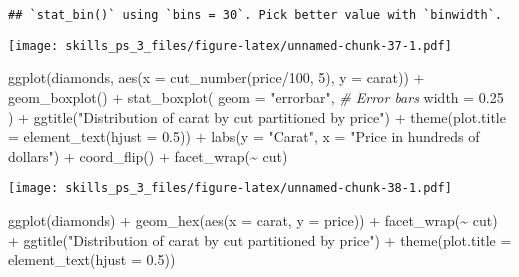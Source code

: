 \documentclass[
]{article}
\newenvironment{Shaded}{\begin{snugshade}}{\end{snugshade}}
\newcommand{\AttributeTok}[1]{\textcolor[rgb]{0.77,0.63,0.00}{#1}}
\newcommand{\CommentTok}[1]{\textcolor[rgb]{0.56,0.35,0.01}{\textit{#1}}}
\newcommand{\DecValTok}[1]{\textcolor[rgb]{0.00,0.00,0.81}{#1}}
\newcommand{\FloatTok}[1]{\textcolor[rgb]{0.00,0.00,0.81}{#1}}
\newcommand{\FunctionTok}[1]{\textcolor[rgb]{0.00,0.00,0.00}{#1}}
\newcommand{\NormalTok}[1]{#1}
\newcommand{\SpecialCharTok}[1]{\textcolor[rgb]{0.00,0.00,0.00}{#1}}
\newcommand{\StringTok}[1]{\textcolor[rgb]{0.31,0.60,0.02}{#1}}
\begin{document}
\begin{verbatim}
## `stat_bin()` using `bins = 30`. Pick better value with `binwidth`.
\end{verbatim}

\texttt{[image: skills\_ps\_3\_files/figure-latex/unnamed-chunk-37-1.pdf]}

\begin{Shaded}
\begin{Highlighting}[]
\FunctionTok{ggplot}\NormalTok{(diamonds, }\FunctionTok{aes}\NormalTok{(}\AttributeTok{x =} \FunctionTok{cut\_number}\NormalTok{(price}\SpecialCharTok{/}\DecValTok{100}\NormalTok{, }\DecValTok{5}\NormalTok{), }\AttributeTok{y =}\NormalTok{ carat)) }\SpecialCharTok{+} 
  \FunctionTok{geom\_boxplot}\NormalTok{() }\SpecialCharTok{+}
  \FunctionTok{stat\_boxplot}\NormalTok{(}
    \AttributeTok{geom =} \StringTok{"errorbar"}\NormalTok{, }\CommentTok{\# Error bars}
    \AttributeTok{width =} \FloatTok{0.25}
\NormalTok{  )  }\SpecialCharTok{+}
  \FunctionTok{ggtitle}\NormalTok{(}\StringTok{"Distribution of carat by cut partitioned by price"}\NormalTok{) }\SpecialCharTok{+}
  \FunctionTok{theme}\NormalTok{(}\AttributeTok{plot.title =} \FunctionTok{element\_text}\NormalTok{(}\AttributeTok{hjust =} \FloatTok{0.5}\NormalTok{)) }\SpecialCharTok{+}
  \FunctionTok{labs}\NormalTok{(}\AttributeTok{y =} \StringTok{"Carat"}\NormalTok{, }\AttributeTok{x =} \StringTok{"Price in hundreds of dollars"}\NormalTok{) }\SpecialCharTok{+}
  \FunctionTok{coord\_flip}\NormalTok{() }\SpecialCharTok{+}
  \FunctionTok{facet\_wrap}\NormalTok{(}\SpecialCharTok{\textasciitilde{}}\NormalTok{ cut)}
\end{Highlighting}
\end{Shaded}

\texttt{[image: skills\_ps\_3\_files/figure-latex/unnamed-chunk-38-1.pdf]}

\begin{Shaded}
\begin{Highlighting}[]
\FunctionTok{ggplot}\NormalTok{(diamonds) }\SpecialCharTok{+} 
  \FunctionTok{geom\_hex}\NormalTok{(}\FunctionTok{aes}\NormalTok{(}\AttributeTok{x =}\NormalTok{ carat, }\AttributeTok{y =}\NormalTok{ price)) }\SpecialCharTok{+}
  \FunctionTok{facet\_wrap}\NormalTok{(}\SpecialCharTok{\textasciitilde{}}\NormalTok{ cut) }\SpecialCharTok{+}
  \FunctionTok{ggtitle}\NormalTok{(}\StringTok{"Distribution of carat by cut partitioned by price"}\NormalTok{) }\SpecialCharTok{+}
  \FunctionTok{theme}\NormalTok{(}\AttributeTok{plot.title =} \FunctionTok{element\_text}\NormalTok{(}\AttributeTok{hjust =} \FloatTok{0.5}\NormalTok{))}
\end{Highlighting}
\end{Shaded}
\end{document}
